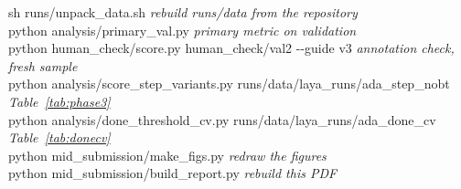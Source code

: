 \documentclass[10.5pt,a4paper]{article}
\begin{document}
\begin{tcolorbox}[colback=shade,colframe=rule,boxrule=0.4pt,arc=1pt,left=6pt,right=6pt,top=3pt,bottom=3pt,fontupper=\small\ttfamily]
sh runs/unpack\_data.sh \hfill\textrm{\itshape rebuild runs/data from the repository}\\
python analysis/primary\_val.py \hfill\textrm{\itshape primary metric on validation}\\
python human\_check/score.py human\_check/val2 -{}-guide v3 \hfill\textrm{\itshape annotation check, fresh sample}\\
python analysis/score\_step\_variants.py runs/data/laya\_runs/ada\_step\_nobt \hfill\textrm{\itshape Table~\ref{tab:phase3}}\\
python analysis/done\_threshold\_cv.py runs/data/laya\_runs/ada\_done\_cv \hfill\textrm{\itshape Table~\ref{tab:donecv}}\\
python mid\_submission/make\_figs.py \hfill\textrm{\itshape redraw the figures}\\
python mid\_submission/build\_report.py \hfill\textrm{\itshape rebuild this PDF}
\end{tcolorbox}
\end{document}
